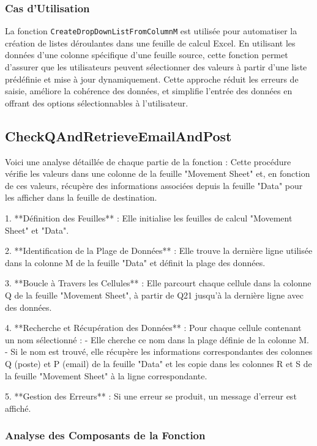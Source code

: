 \documentclass[a4paper, oneside, 12pt, final]{extreport}
\begin{document}
\subsubsection{Cas d'Utilisation}
La fonction \texttt{CreateDropDownListFromColumnM} est utilisée pour automatiser la création de listes déroulantes dans une feuille de calcul Excel. En utilisant les données d'une colonne spécifique d'une feuille source, cette fonction permet d'assurer que les utilisateurs peuvent sélectionner des valeurs à partir d'une liste prédéfinie et mise à jour dynamiquement. Cette approche réduit les erreurs de saisie, améliore la cohérence des données, et simplifie l'entrée des données en offrant des options sélectionnables à l'utilisateur.
\subsection{CheckQAndRetrieveEmailAndPost}

Voici une analyse détaillée de chaque partie de la fonction :
Cette procédure vérifie les valeurs dans une colonne de la feuille "Movement Sheet" et, en fonction de ces valeurs, récupère des informations associées depuis la feuille "Data" pour les afficher dans la feuille de destination.

1. **Définition des Feuilles** : Elle initialise les feuilles de calcul "Movement Sheet" et "Data".

2. **Identification de la Plage de Données** : Elle trouve la dernière ligne utilisée dans la colonne M de la feuille "Data" et définit la plage des données.

3. **Boucle à Travers les Cellules** : Elle parcourt chaque cellule dans la colonne Q de la feuille "Movement Sheet", à partir de Q21 jusqu'à la dernière ligne avec des données.

4. **Recherche et Récupération des Données** : Pour chaque cellule contenant un nom sélectionné :
   - Elle cherche ce nom dans la plage définie de la colonne M.
   - Si le nom est trouvé, elle récupère les informations correspondantes des colonnes Q (poste) et P (email) de la feuille "Data" et les copie dans les colonnes R et S de la feuille "Movement Sheet" à la ligne correspondante.

5. **Gestion des Erreurs** : Si une erreur se produit, un message d'erreur est affiché.
\subsubsection{Analyse des Composants de la Fonction}
\end{document}
